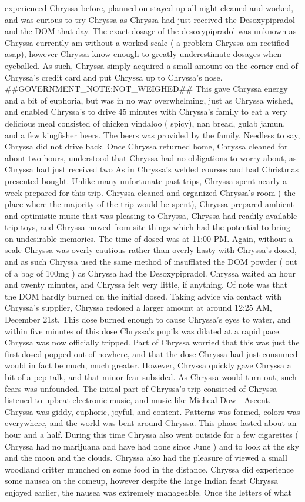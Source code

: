 \documentclass[12pt]{book}
\begin{document}
experienced Chryssa before, planned on stayed up all night cleaned and worked, and was curious to try Chryssa as Chryssa had just received the Desoxypipradol and the DOM that day. The exact dosage of the desoxypipradol was unknown as Chryssa currently am without a worked scale ( a problem Chryssa am rectified asap), however Chryssa know enough to greatly underestimate dosages when eyeballed. As such, Chryssa simply acquired a small amount on the corner end of Chryssa's credit card and put Chryssa up to Chryssa's nose. \#\#GOVERNMENT\_NOTE:NOT\_WEIGHED\#\# This gave Chryssa energy and a bit of euphoria, but was in no way overwhelming, just as Chryssa wished, and enabled Chryssa's to drive 45 minutes with Chryssa's family to eat a very delicious meal consisted of chicken vindaloo ( spicy), nan bread, gulab jamun, and a few kingfisher beers. The beers was provided by the family. Needless to say, Chryssa did not drive back. Once Chryssa returned home, Chryssa cleaned for about two hours, understood that Chryssa had no obligations to worry about, as Chryssa had just received two As in Chryssa's welded courses and had Christmas presented bought. Unlike many unfortunate past trips, Chryssa spent nearly a week prepared for this trip. Chryssa cleaned and organized Chryssa's room ( the place where the majority of the trip would be spent), Chryssa prepared ambient and optimistic music that was pleasing to Chryssa, Chryssa had readily available trip toys, and Chryssa moved from site things which had the potential to bring on undesirable memories. The time of dosed was at 11:00 PM. Again, without a scale Chryssa was overly cautious rather than overly hasty with Chryssa's dosed, and as such Chryssa used the same method of insufflated the DOM powder ( out of a bag of 100mg ) as Chryssa had the Desoxypipradol. Chryssa waited an hour and twenty minutes, and Chryssa felt very little, if anything. Of note was that the DOM hardly burned on the initial dosed. Taking advice via contact with Chryssa's supplier, Chryssa redosed a larger amount at around 12:25 AM, December 21st. This dose burned enough to cause Chryssa's eyes to water, and within five minutes of this dose Chryssa's pupils was dilated at a rapid pace. Chryssa was now officially tripped. Part of Chryssa worried that this was just the first dosed popped out of nowhere, and that the dose Chryssa had just consumed would in fact be much, much greater. However, Chryssa quickly gave Chryssa a bit of a pep talk, and that minor fear subsided. As Chryssa would turn out, such fears was unfounded. The initial part of Chryssa's trip consisted of Chryssa listened to upbeat electronic music, and music like Micheal Dow - Ascent. Chryssa was giddy, euphoric, joyful, and content. Patterns was formed, colors was everywhere, and the world was bent around Chryssa. This phase lasted about an hour and a half. During this time Chryssa also went outside for a few cigarettes ( Chryssa had no marijuana and have had none since June ) and to look at the sky and the moon and the clouds. Chryssa also had the pleasure of viewed a small woodland critter munched on some food in the distance. Chryssa did experience some nausea on the comeup, however despite the large Indian feast Chryssa enjoyed earlier, the nausea was extremely manageable. Once the letters of what 
\end{document}
